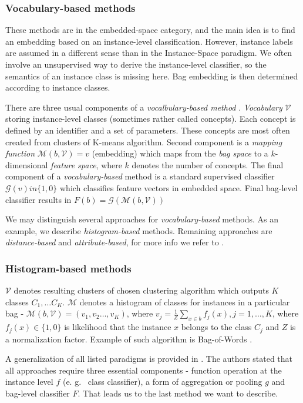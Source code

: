 \subsubsection{Vocabulary-based methods}
These methods are in the embedded-space category, and the main idea is to find an embedding based on an instance-level classification. However, instance labels are assumed in a different sense than in the Instance-Space paradigm. We often involve an unsupervised way to derive the instance-level classifier, so the semantics of an instance class is missing here. Bag embedding is then determined according to instance classes.

There are three usual components of a \emph{vocalbulary-based method} \cite{Amores2013}. \emph{Vocabulary} $\mathcal{V}$ storing instance-level classes (sometimes rather called concepts). Each concept is defined by an identifier and a set of parameters. These concepts are most often created from clusters of K-means algorithm. Second component is a \emph{mapping function} $\mathcal{M}(b, \mathcal{V})=v$ (embedding) which maps from the \emph{bag space} to  a $k$-dimensional \emph{feature space}, where $k$ denotes the number of concepts. The final component of a \emph{vocabulary-based} method is a standard supervised classifier $\mathcal{G}(v) in \{1,0\}$ which classifies feature vectors in embedded space. Final bag-level classifier results in $F(b)=\mathcal{G}(\mathcal{M}(b,\mathcal{V}))$

We may distinguish several approaches for \emph{vocabulary-based} methods. As an example, we describe \emph{histogram-based} methods. Remaining approaches are \emph{distance-based} and \emph{attribute-based}, for more info we refer to \cite{Amores2013}.

\subsubsection{Histogram-based methods}
$\mathcal{V}$ denotes resulting clusters of chosen clustering algorithm which outputs $K$ classes $C_1,\dots C_K$. $\mathcal{M}$ denotes a histogram of classes for instances in a particular bag - $\mathcal{M}(b,\mathcal{V})=(v_1,v_2\dots,v_K)$, where $v_j=\frac{1}{Z}\sum_{x\in b}f_{j}(x), j=1,\dots,K$, where $f_{j}(x) \in \{1,0\}$ is likelihood that the instance $x$ belongs to the class $C_j$ and $Z$ is a normalization factor. Example of such algorithm is Bag-of-Words \cite{Nowak2006}.

A generalization of all listed paradigms is provided in \cite{Mandlik2020}. The authors stated that all approaches require three essential components - function operation at the instance level $f$ (e. g. \ class classifier), a form of aggregation or pooling $g$ and bag-level classifier $F$. That leads us to the last method we want to describe.

